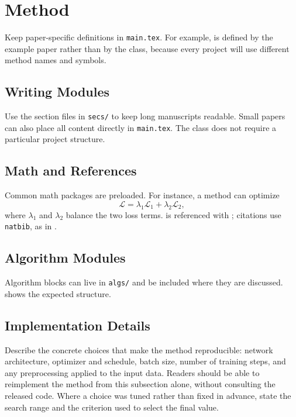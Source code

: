 \section{Method}

Keep paper-specific definitions in \texttt{main.tex}. For example,
\texttt{\string\method} is defined by the example paper rather than by the
class, because every project will use different method names and symbols.

\subsection{Writing Modules}

Use the section files in \texttt{secs/} to keep long manuscripts readable.
Small papers can also place all content directly in \texttt{main.tex}. The class
does not require a particular project structure.

\subsection{Math and References}

Common math packages are preloaded. For instance, a method can optimize
\begin{equation}
  \mathcal{L} = \lambda_1 \mathcal{L}_{\mathrm{1}}
    + \lambda_2 \mathcal{L}_{\mathrm{2}},
  \label{eq:loss}
\end{equation}
where \(\lambda_1\) and \(\lambda_2\) balance the two loss terms.
 is referenced with \texttt{\string\eqnref}; citations use
\texttt{natbib}, as in \cite{lamport1994latex,mittelbach2004latex}.

\subsection{Algorithm Modules}

Algorithm blocks can live in \texttt{algs/} and be included where they are
discussed.  shows the expected structure.



\subsection{Implementation Details}

Describe the concrete choices that make the method reproducible: network
architecture, optimizer and schedule, batch size, number of training steps,
and any preprocessing applied to the input data. Readers should be able to
reimplement the method from this subsection alone, without consulting the
released code. Where a choice was tuned rather than fixed in advance, state
the search range and the criterion used to select the final value.
